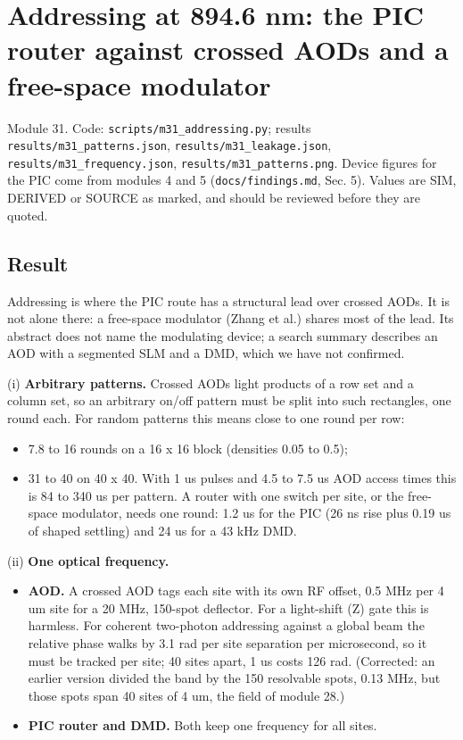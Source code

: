 \hypertarget{addressing-at-8946-nm-the-pic-router-against-crossed-aods-and-a-free-space-modulator}{%
\chapter{Addressing at 894.6 nm: the PIC router against crossed AODs and
a free-space
modulator}\label{addressing-addressing-at-8946-nm-the-pic-router-against-crossed-aods-and-a-free-space-modulator}}

Module 31. Code: \texttt{scripts/m31\_addressing.py}; results
\texttt{results/m31\_patterns.json}, \texttt{results/m31\_leakage.json},
\texttt{results/m31\_frequency.json},
\texttt{results/m31\_patterns.png}. Device figures for the PIC come from
modules 4 and 5 (\texttt{docs/findings.md}, Sec. 5). Values are SIM,
DERIVED or SOURCE as marked, and should be reviewed before they are
quoted.

\hypertarget{1-result}{%
\section{Result}\label{addressing-1-result}}

Addressing is where the PIC route has a structural lead over crossed
AODs. It is not alone there: a free-space modulator (Zhang et al.)
shares most of the lead. Its abstract does not name the modulating
device; a search summary describes an AOD with a segmented SLM and a
DMD, which we have not confirmed.

(i) \textbf{Arbitrary patterns.} Crossed AODs light products of a row
set and a column set, so an arbitrary on/off pattern must be split into
such rectangles, one round each. For random patterns this means close to
one round per row:

\begin{itemize}
\tightlist
\item
  7.8 to 16 rounds on a 16 x 16 block (densities 0.05 to 0.5);
\item
  31 to 40 on 40 x 40. With 1 us pulses and 4.5 to 7.5 us AOD access
  times this is 84 to 340 us per pattern. A router with one switch per
  site, or the free-space modulator, needs one round: 1.2 us for the PIC
  (26 ns rise plus 0.19 us of shaped settling) and 24 us for a 43 kHz
  DMD.
\end{itemize}

(ii) \textbf{One optical frequency.}

\begin{itemize}
\tightlist
\item
  \textbf{AOD.} A crossed AOD tags each site with its own RF offset, 0.5
  MHz per 4 um site for a 20 MHz, 150-spot deflector. For a light-shift
  (Z) gate this is harmless. For coherent two-photon addressing against
  a global beam the relative phase walks by 3.1 rad per site separation
  per microsecond, so it must be tracked per site; 40 sites apart, 1 us
  costs 126 rad. (Corrected: an earlier version divided the band by the
  150 resolvable spots, 0.13 MHz, but those spots span 40 sites of 4 um,
  the field of module 28.)
\item
  \textbf{PIC router and DMD.} Both keep one frequency for all sites.
\end{itemize}

